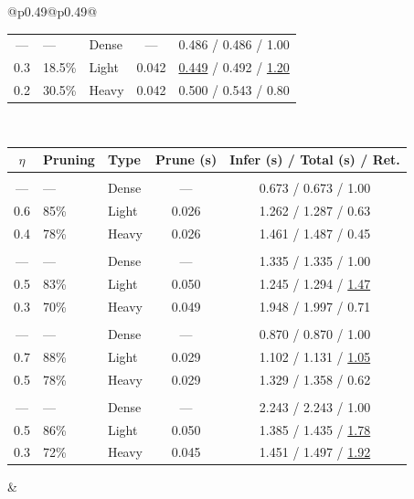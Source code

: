 \begin{table}[!htbp]
\begin{tabular}{@{}p{}@{}p{}@{}}
\begin{tabular}{c l l c c}
--- & --- & Dense & --- & 0.486 / 0.486 / 1.00 \\
0.3 & 18.5\% & Light & 0.042 & \underline{0.449} / 0.492 / \underline{1.20} \\
0.2 & 30.5\% & Heavy & 0.042 & 0.500 / 0.543 / 0.80 \\
\bottomrule
\end{tabular} \\[0.5em]
\begin{tabular}{c l l c c}
\toprule
\textbf{$\eta$} & \textbf{Pruning} & \textbf{Type} & \textbf{Prune (s)} & \textbf{Infer (s)} / \textbf{Total (s)} / \textbf{Ret.} \\
\midrule
\rowcolor{lightgray} \multicolumn{5}{c}{\rule{0pt}{2.2ex}\textbf{Qwen2.5-7B (Cross-domain)}\rule[-0.8ex]{0pt}{0pt}} \\
--- & --- & Dense & --- & 0.673 / 0.673 / 1.00 \\
0.6 & 85\% & Light & 0.026 & 1.262 / 1.287 / 0.63 \\
0.4 & 78\% & Heavy & 0.026 & 1.461 / 1.487 / 0.45 \\
\addlinespace[0.5pt]
\rowcolor{lightgray} \multicolumn{5}{c}{\rule{0pt}{2.2ex}\textbf{Qwen2.5-14B (Cross-domain)}\rule[-0.8ex]{0pt}{0pt}} \\
--- & --- & Dense & --- & 1.335 / 1.335 / 1.00 \\
0.5 & 83\% & Light & 0.050 & 1.245 / 1.294 / \underline{1.47} \\
0.3 & 70\% & Heavy & 0.049 & 1.948 / 1.997 / 0.71 \\
\addlinespace[0.5pt]
\rowcolor{lightgray} \multicolumn{5}{c}{\rule{0pt}{2.2ex}\textbf{LLaMA-3.1-8B (Cross-domain)}\rule[-0.8ex]{0pt}{0pt}} \\
--- & --- & Dense & --- & 0.870 / 0.870 / 1.00 \\
0.7 & 88\% & Light & 0.029 & 1.102 / 1.131 / \underline{1.05} \\
0.5 & 78\% & Heavy & 0.029 & 1.329 / 1.358 / 0.62 \\
\addlinespace[0.5pt]
\rowcolor{lightgray} \multicolumn{5}{c}{\rule{0pt}{2.2ex}\textbf{LLaMA-2-13B (Cross-domain)}\rule[-0.8ex]{0pt}{0pt}} \\
--- & --- & Dense & --- & 2.243 / 2.243 / 1.00 \\
0.5 & 86\% & Light & 0.050 & 1.385 / 1.435 / \underline{1.78} \\
0.3 & 72\% & Heavy & 0.045 & 1.451 / 1.497 / \underline{1.92} \\
\bottomrule
\end{tabular} &\begin{tabular}{c l l c c}

\end{tabular}
\end{tabular}
\end{table}
